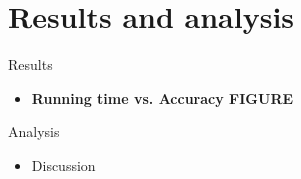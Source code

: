 \section{Results and analysis}
 \begin{frame}{Results}
     \begin{itemize}
         \item{ \textbf{Running time vs. Accuracy FIGURE}
         }
     \end{itemize}
 \end{frame}
 
 \begin{frame}{Analysis}
 	\begin{itemize}
 	\item {Discussion}
 	\end{itemize}
 
 \end{frame}